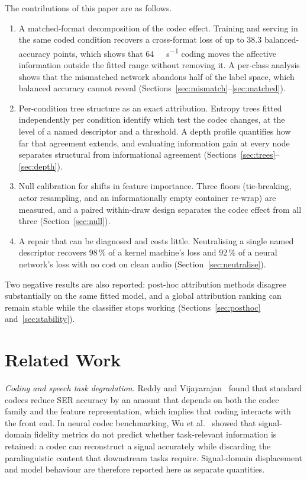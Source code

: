 \documentclass[lettersize,journal]{IEEEtran}
\begin{document}
The contributions of this paper are as follows.
\begin{enumerate}
\item A matched-format decomposition of the codec effect. Training and serving
      in the same coded condition recovers a cross-format loss of up to 38.3
      balanced-accuracy points, which shows that \SI{64}{\kilo\bit\per\second}
      coding moves the affective information outside the fitted range without
      removing it. A per-class analysis shows that the mismatched network
      abandons half of the label space, which balanced accuracy cannot reveal
      (Sections~\ref{sec:mismatch}--\ref{sec:matched}).
\item Per-condition tree structure as an exact attribution. Entropy trees
      fitted independently per condition identify which test the codec
      changes, at the level of a named descriptor and a threshold. A depth
      profile quantifies how far that agreement extends, and evaluating
      information gain at every node separates structural from informational
      agreement (Sections~\ref{sec:trees}--\ref{sec:depth}).
\item Null calibration for shifts in feature importance. Three floors
      (tie-breaking, actor resampling, and an informationally empty container
      re-wrap) are measured, and a paired within-draw design separates the
      codec effect from all three (Section~\ref{sec:null}).
\item A repair that can be diagnosed and costs little. Neutralising a single
      named descriptor recovers 98\,\% of a kernel machine's loss and 92\,\% of
      a neural network's loss with no cost on clean audio
      (Section~\ref{sec:neutralise}).
\end{enumerate}
Two negative results are also reported: post-hoc attribution methods disagree
substantially on the same fitted model, and a global attribution ranking can
remain stable while the classifier stops working
(Sections~\ref{sec:posthoc} and~\ref{sec:stability}).

\section{Related Work}

\textit{Coding and speech task degradation.} Reddy and
Vijayarajan~\cite{reddy2020compression} found that standard codecs reduce SER
accuracy by an amount that depends on both the codec family and the feature
representation, which implies that coding interacts with the front end. In
neural codec benchmarking, Wu et al.~\cite{wu2024codecsuperb} showed that
signal-domain fidelity metrics do not predict whether task-relevant information
is retained: a codec can reconstruct a signal accurately while discarding the
paralinguistic content that downstream tasks require. Signal-domain
displacement and model behaviour are therefore reported here as separate
quantities.
\end{document}
